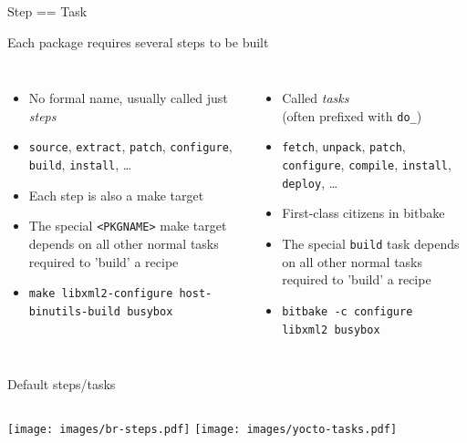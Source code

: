 \documentclass[xetex,table,aspectratio=169]{beamer}
\begin{document}
\begin{frame}{Step == Task}
  \begin{center}
    Each package requires several steps to be built
  \end{center}

  \begin{columns}
    \begin{itemize}
    \item No formal name, usually called just {\em steps}
    \item {\tt source}, {\tt extract}, {\tt patch}, {\tt configure},
      {\tt build}, {\tt install}, \dots
    \item Each step is also a make target
    \item The special {\tt <PKGNAME>} make target depends on all other normal
      tasks required to 'build' a recipe
    \item {\tt make libxml2-configure host-binutils-build busybox}
    \end{itemize}

    \begin{itemize}
    \item Called {\em tasks}\\
      (often prefixed with {\tt do\_})
    \item {\tt fetch}, {\tt unpack}, {\tt patch}, {\tt configure},
      {\tt compile}, {\tt install}, {\tt deploy}, \dots
    \item First-class citizens in bitbake
    \item The special {\tt build} task depends on all other normal
      tasks required to 'build' a recipe
    \item {\tt bitbake -c configure\\
      libxml2 busybox}
    \end{itemize}
  \end{columns}
\end{frame}

\begin{frame}{Default steps/tasks}
  \begin{columns}
    \center\texttt{[image: images/br-steps.pdf]}
  \center\texttt{[image: images/yocto-tasks.pdf]}
  \end{columns}
\end{frame}
\end{document}
